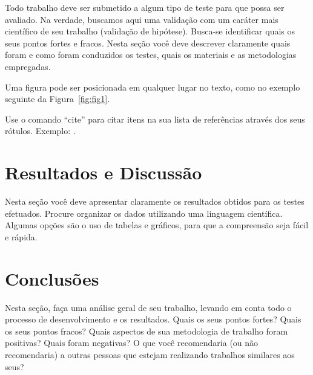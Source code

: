 \documentclass[twoside,conference,a4paper]{IEEEtran}
\begin{document}
Todo trabalho deve ser submetido a algum tipo de teste para que possa ser avaliado. Na verdade, buscamos aqui uma validação com um caráter mais científico de seu trabalho (validação de hipótese). Busca-se identificar quais os seus pontos fortes e fracos. Nesta seção você deve descrever claramente quais foram e como foram conduzidos os testes, quais os materiais e as metodologias empregadas.   

Uma figura pode ser posicionada em qualquer lugar no texto, como no exemplo seguinte da Figura~\ref{fig:fig1}.

Use o comando ``cite'' para citar itens na sua lista de
referências através dos seus rótulos. Exemplo: \cite{Moro:2014}\cite{UCI:2014}.


\section{Resultados e Discussão}

Nesta seção você deve apresentar claramente os resultados obtidos para os testes efetuados. Procure organizar os dados utilizando uma linguagem científica. Algumas opções são o uso de tabelas e gráficos, para que a compreensão seja fácil e rápida. 

\section{Conclusões}

Nesta seção, faça uma análise geral de seu trabalho, levando em conta todo o processo de desenvolvimento e os resultados. Quais os seus pontos fortes? Quais os seus pontos fracos? Quais aspectos de sua metodologia de trabalho foram positivas? Quais foram negativas? O que você recomendaria (ou não recomendaria) a outras pessoas que estejam realizando trabalhos similares aos seus? 
\end{document}
